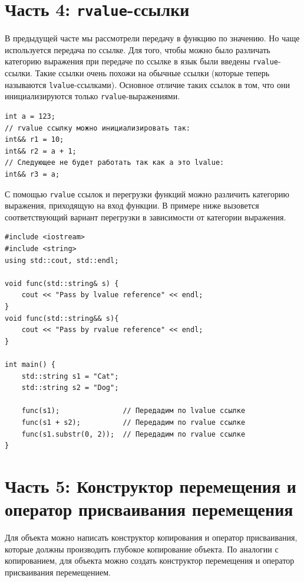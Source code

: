 \documentclass{article}
\begin{document}
\newpage
\section*{Часть 4: \texttt{rvalue}-ссылки}
В предыдущей часте мы рассмотрели передачу в функцию по значению. Но чаще используется передача по ссылке. Для того, чтобы можно было различать категорию выражения при передаче по ссылке в язык были введены \texttt{rvalue}-ссылки. Такие ссылки очень похожи на обычные ссылки (которые теперь называются \texttt{lvalue}-ссылками). Основное отличие таких ссылок в том, что они инициализируются только \texttt{rvalue}-выражениями.

\begin{lstlisting}
int a = 123;
// rvalue ссылку можно инициализировать так:
int&& r1 = 10;
int&& r2 = a + 1;
// Следующее не будет работать так как a это lvalue:
int&& r3 = a; 
\end{lstlisting}


С помощью \texttt{rvalue} ссылок и перегрузки функций можно различить категорию выражения, приходящую на вход функции. В примере ниже вызовется соответствующий вариант перегрузки в зависимости от категории выражения.
\begin{lstlisting}
#include <iostream>
#include <string>
using std::cout, std::endl;

void func(std::string& s) {
    cout << "Pass by lvalue reference" << endl;
}
void func(std::string&& s){
    cout << "Pass by rvalue reference" << endl;
}

int main() {
    std::string s1 = "Cat";
    std::string s2 = "Dog";

    func(s1);               // Передадим по lvalue ссылке
    func(s1 + s2);          // Передадим по rvalue ссылке
    func(s1.substr(0, 2));  // Передадим по rvalue ссылке
}
\end{lstlisting}

\newpage
\section*{Часть 5: Конструктор перемещения и оператор присваивания перемещения}
Для объекта можно написать конструктор копирования и оператор присваивания, которые должны производить глубокое копирование объекта. По аналогии с копированием, для объекта можно создать конструктор перемещения и оператор присваивания перемещением.

\newpage
\end{document}
